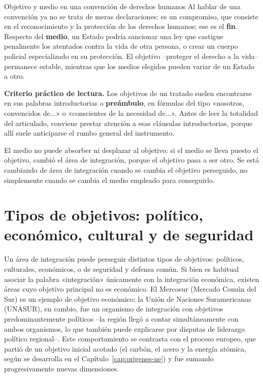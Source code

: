 \documentclass[12pt,oneside]{book}
\begin{document}
\begin{ejemplo}{Objetivo y medio en una convención de derechos humanos}
Al hablar de una convención ya no se trata de meras declaraciones: es un compromiso, que consiste en el reconocimiento y la protección de los derechos humanos; ese es el \textbf{fin}. Respecto del \textbf{medio}, un Estado podría sancionar una ley que castigue penalmente los atentados contra la vida de otra persona, o crear un cuerpo policial especializado en su protección. El objetivo --proteger el derecho a la vida-- permanece estable, mientras que los medios elegidos pueden variar de un Estado a otro.
\end{ejemplo}

\textbf{Criterio práctico de lectura.} Los objetivos de un tratado suelen encontrarse en sus palabras introductorias o \textbf{preámbulo}, en fórmulas del tipo «nosotros, convencidos de...» o «conscientes de la necesidad de...». Antes de leer la totalidad del articulado, conviene prestar atención a esas cláusulas introductorias, porque allí suele anticiparse el rumbo general del instrumento.

\begin{importante}
El medio no puede absorber ni desplazar al objetivo: si el medio se lleva puesto el objetivo, cambió el área de integración, porque el objetivo pasa a ser otro. Se está cambiando de área de integración cuando se cambia el objetivo perseguido, no simplemente cuando se cambia el medio empleado para conseguirlo.
\end{importante}

\section{Tipos de objetivos: político, económico, cultural y de seguridad}

Un área de integración puede perseguir distintos tipos de objetivos: políticos, culturales, económicos, o de seguridad y defensa común. Si bien es habitual asociar la palabra «integración» únicamente con la integración económica, existen áreas cuyo objetivo principal no es económico. El Mercosur (Mercado Común del Sur) es un ejemplo de objetivo económico; la Unión de Naciones Suramericanas (UNASUR), en cambio, fue un organismo de integración con objetivos predominantemente políticos --la región llegó a contar simultáneamente con ambos organismos, lo que también puede explicarse por disputas de liderazgo político regional--. Este comportamiento se contrasta con el proceso europeo, que partió de un objetivo inicial acotado (el carbón, el acero y la energía atómica, según se desarrolla en el Capítulo~\ref{cap:origenes-ue}) y fue sumando progresivamente nuevas dimensiones.
\end{document}
